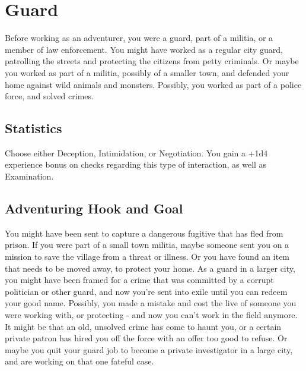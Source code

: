 \section{Guard}\label{background:guard}
Before working as an adventurer, you were a guard, part of a militia, or a member of law enforcement.
You might have worked as a regular city guard, patrolling the streets and protecting the citizens from petty criminals.
Or maybe you worked as part of a militia, possibly of a smaller town, and defended your home against wild animals and monsters.
Possibly, you worked as part of a police force, and solved crimes.

\subsection{Statistics}
Choose either Deception, Intimidation, or Negotiation.
You gain a +1d4 experience bonus on checks regarding this type of interaction, as well as Examination.

\subsection{Adventuring Hook and Goal}
You might have been sent to capture a dangerous fugitive that has fled from prison.
If you were part of a small town militia, maybe someone sent you on a mission to save the village from a threat or illness.
Or you have found an item that needs to be moved away, to protect your home.
As a guard in a larger city, you might have been framed for a crime that was committed by a corrupt politician or other guard, and now you're sent into exile until you can redeem your good name.
Possibly, you made a mistake and cost the live of someone you were working with, or protecting - and now you can't work in the field anymore.
It might be that an old, unsolved crime has come to haunt you, or a certain private patron has hired you off the force with an offer too good to refuse.
Or maybe you quit your guard job to become a private investigator in a large city, and are working on that one fateful case.